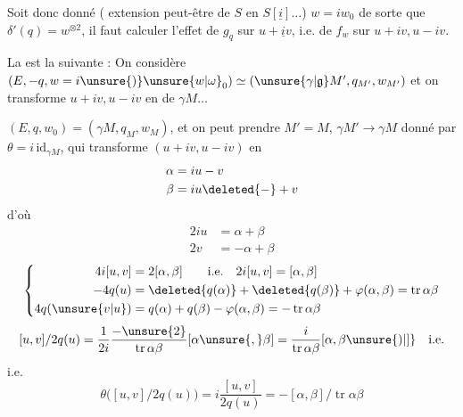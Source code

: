Soit donc donné ( extension peut-être de $S$ en $S[\underline{i}]\ldots$) $w=iw_0$ de sorte que $\delta'(q)=w^{\otimes2}$, il faut calculer l'effet de $g_q$ sur $u+\underline{i}v$, i.e. de $f_w$ sur $u+iv,u-iv$.

La  est la suivante : On considère $(E,-q,w=i\unsure{)}\unsure{w|\omega}_0)\simeq(\unsure{\gamma|\mathfrak g}M',q_{M'},w_{M'})$ et on transforme $u+iv,u-iv$ en  de $\gamma M\ldots$

 \quad $(E,q,w_0)=(\gamma M,q_M,w_M)$,
 et on peut prendre $M'=M$, $\gamma M'\longrightarrow\gamma M$ donné par $\theta=i\,\mathrm{id}_{\gamma M}$, qui transforme $(u+iv,u-iv)$ en
\[
\begin{aligned}
\alpha&=iu-v\\
\beta&=iu\deleted{-}+v
\end{aligned}
\]
d'où
\[
\begin{aligned}
2iu&=\alpha+\beta\\
2v&=-\alpha+\beta
\end{aligned}
\]
\[
\left\{\begin{aligned}
4i[u,v]&=2[\alpha,\beta]\qquad\text{i.e.}\quad 2i[u,v]=[\alpha,\beta]\\
-4q(u)&=\deleted{q(\alpha)}+\deleted{q(\beta)}+\varphi(\alpha,\beta)=\operatorname{tr}\alpha\beta\\
4q(\unsure{v|u})&=q(\alpha)+q(\beta)-\varphi(\alpha,\beta)=-\operatorname{tr}\alpha\beta
\end{aligned}\right.
\]
\[
[u,v]/2q(u)=\frac{1}{2i}\frac{-\unsure{2}}{\operatorname{tr}\alpha\beta}[\alpha\unsure{,}\beta]=\frac{i}{\operatorname{tr}\alpha\beta}[\alpha,\beta\unsure{)|]}\quad\text{i.e.}
\]
i.e.
\[
\theta\bigl([u,v]/2q(u)\bigr)=i\frac{[u,v]}{2q(u)}=-[\alpha,\beta]/\operatorname{tr}\alpha\beta
\]
